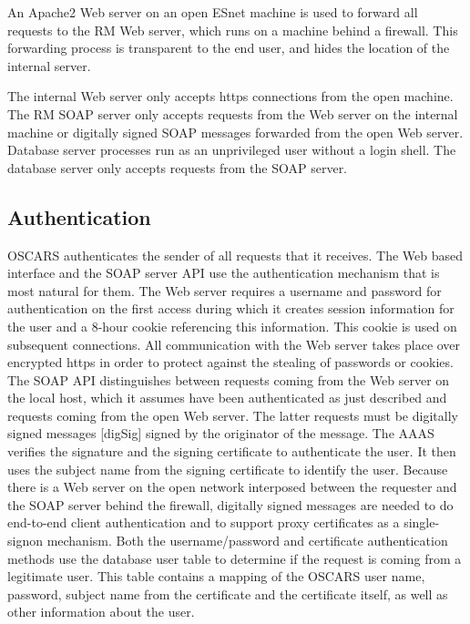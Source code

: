 \documentclass[conference]{IEEEtran}
\begin{document}
An Apache2 Web server on an open ESnet machine is used to forward all 
requests to the RM Web server, which runs on a machine behind a firewall. 
This forwarding process is transparent to the end user, and hides the location 
of the internal server.

The internal Web server only accepts https connections from the open machine.
The RM SOAP server only accepts requests from the Web server on the internal 
machine
or digitally signed SOAP messages forwarded from the open Web server.
Database server processes run as an unprivileged user without a login 
shell.  The database server only accepts requests from the SOAP server.


\subsection{Authentication}
OSCARS authenticates the sender of all requests that it receives.
The Web based interface and the SOAP server API use the
authentication mechanism that is most natural for them. The Web server
requires a username and password for authentication on the first
access during which it creates session information for the user and a
8-hour cookie referencing this information. This cookie is used on subsequent
connections. All communication with the Web server takes place over
encrypted https in order to protect against the stealing of passwords
or cookies. The SOAP API distinguishes between requests coming from
the Web server on the local host, which it assumes have been authenticated
as just described and requests coming from the open Web server. The 
latter requests  must be digitally signed messages [digSig] signed by the
originator of the message. The AAAS verifies the signature and the signing 
certificate to authenticate
the user. It then uses the subject name from the signing certificate
to identify the user. Because there is a Web server on the open network 
interposed between the
requester and the SOAP server behind the firewall, digitally signed messages 
are 
needed to do end-to-end client authentication and to support proxy certificates
as a single-signon mechanism. Both the username/password and certificate 
authentication methods use the database user table to
determine if the request is coming from a legitimate user. This table
contains a mapping of the OSCARS user name, password, subject name
from the certificate and the certificate itself, as well as other
information about the user.
\end{document}
